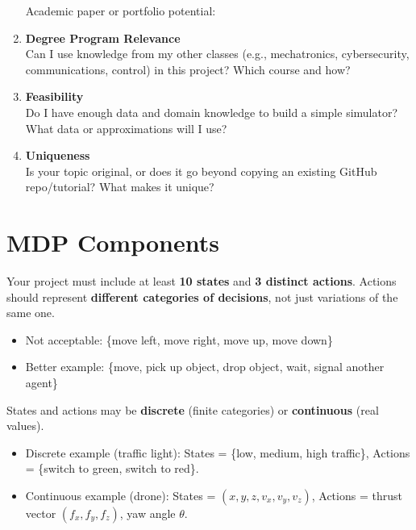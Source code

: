 \documentclass[12pt,a4paper]{article}
\begin{document}
\begin{enumerate}
\begin{tcolorbox}[height=5cm]
    Academic paper or portfolio potential:
    
    \vspace{1em}
    \end{tcolorbox}

    \item \textbf{Degree Program Relevance} \\[3pt]
    Can I use knowledge from my other classes (e.g., mechatronics, cybersecurity, communications, control) in this project? Which course and how?
    \begin{tcolorbox}[height=2.5cm]
    \end{tcolorbox}

    \item \textbf{Feasibility} \\[3pt]
    Do I have enough data and domain knowledge to build a simple simulator? What data or approximations will I use?  
    \begin{tcolorbox}[height=4cm]
    \end{tcolorbox}

    \item \textbf{Uniqueness} \\[3pt]
    Is your topic original, or does it go beyond copying an existing GitHub repo/tutorial? What makes it unique?  
    \begin{tcolorbox}[height=4cm]
    \end{tcolorbox}
\end{enumerate}

\section*{MDP Components}

\noindent
Your project must include at least \textbf{10 states} and \textbf{3 distinct actions}.  
Actions should represent \textbf{different categories of decisions}, not just variations of the same one.  

\begin{itemize}
    \item Not acceptable: \{move left, move right, move up, move down\}  
    \item Better example: \{move, pick up object, drop object, wait, signal another agent\}  
\end{itemize}

States and actions may be \textbf{discrete} (finite categories) or \textbf{continuous} (real values).  

\begin{itemize}
    \item Discrete example (traffic light): States = \{low, medium, high traffic\}, Actions = \{switch to green, switch to red\}.  
    \item Continuous example (drone): States = $(x,y,z,v_x,v_y,v_z)$, Actions = thrust vector $(f_x,f_y,f_z)$, yaw angle $\theta$.  
\end{itemize}
\end{document}
